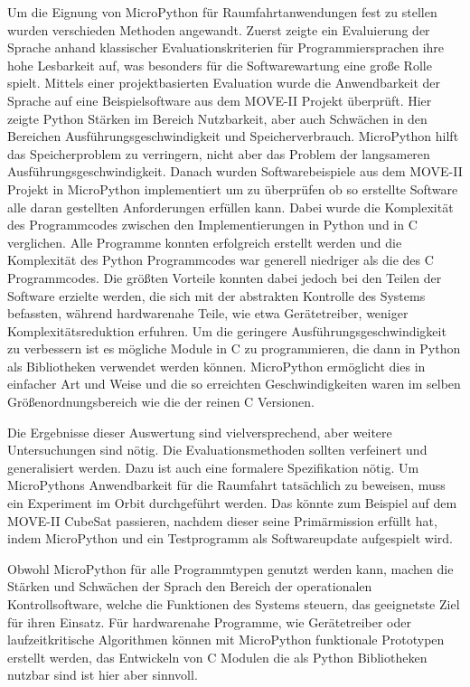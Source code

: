 Um die Eignung von MicroPython für Raumfahrtanwendungen fest zu stellen wurden verschieden Methoden angewandt. Zuerst zeigte ein Evaluierung der Sprache anhand klassischer Evaluationskriterien für Programmiersprachen ihre hohe Lesbarkeit auf, was besonders für die Softwarewartung eine große Rolle spielt. Mittels einer projektbasierten Evaluation wurde die Anwendbarkeit der Sprache auf eine Beispielsoftware aus dem MOVE-II Projekt überprüft. Hier zeigte Python Stärken im Bereich Nutzbarkeit, aber auch Schwächen in den Bereichen Ausführungsgeschwindigkeit und Speicherverbrauch. MicroPython hilft das Speicherproblem zu verringern, nicht aber das Problem der langsameren Ausführungsgeschwindigkeit. Danach wurden Softwarebeispiele aus dem MOVE-II Projekt in MicroPython implementiert um zu überprüfen ob so erstellte Software alle daran gestellten Anforderungen erfüllen kann. Dabei wurde die Komplexität des Programmcodes zwischen den Implementierungen in Python und in C verglichen. Alle Programme konnten erfolgreich erstellt werden und die Komplexität des Python Programmcodes war generell niedriger als die des C Programmcodes. Die größten Vorteile konnten dabei jedoch bei den Teilen der Software erzielte werden, die sich mit der abstrakten Kontrolle des Systems befassten, während hardwarenahe Teile, wie etwa Gerätetreiber, weniger Komplexitätsreduktion erfuhren. Um die geringere Ausführungsgeschwindigkeit zu verbessern ist es mögliche Module in C zu programmieren, die dann in Python als Bibliotheken verwendet werden können. MicroPython ermöglicht dies in einfacher Art und Weise und die so erreichten Geschwindigkeiten waren im selben Größenordnungsbereich wie die der reinen C Versionen.

Die Ergebnisse dieser Auswertung sind vielversprechend, aber weitere Untersuchungen sind nötig. Die Evaluationsmethoden sollten verfeinert und generalisiert werden. Dazu ist auch eine formalere Spezifikation nötig. Um MicroPythons Anwendbarkeit für die Raumfahrt tatsächlich zu beweisen, muss ein Experiment im Orbit durchgeführt werden. Das könnte zum Beispiel auf dem MOVE-II CubeSat passieren, nachdem dieser seine Primärmission erfüllt hat, indem MicroPython und ein Testprogramm als Softwareupdate aufgespielt wird.

Obwohl MicroPython für alle Programmtypen genutzt werden kann, machen die Stärken und Schwächen der Sprach den Bereich der operationalen Kontrollsoftware, welche die Funktionen des Systems steuern, das geeignetste Ziel für ihren Einsatz. Für hardwarenahe Programme, wie Gerätetreiber oder laufzeitkritische Algorithmen können mit MicroPython funktionale Prototypen erstellt werden, das Entwickeln von C Modulen die als Python Bibliotheken nutzbar sind ist hier aber sinnvoll.
